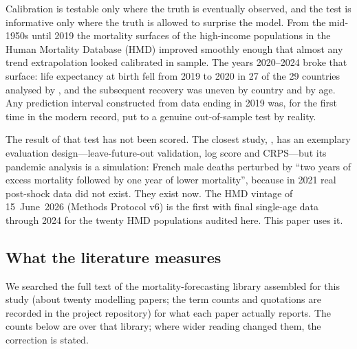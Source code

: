Calibration is testable only where the truth is eventually observed, and the
test is informative only where the truth is allowed to surprise the model.
From the mid-1950s until 2019 the mortality surfaces of the high-income
populations in the Human Mortality Database (HMD) improved smoothly enough
that almost any trend extrapolation looked calibrated in sample. The years
2020--2024 broke that surface: life expectancy at birth fell from 2019 to
2020 in 27 of the 29 countries analysed by \citet{aburto2022quantifying},
and the subsequent recovery was uneven by country and by age. Any
prediction interval constructed from data ending in 2019 was,
for the first time in the modern record, put to a genuine out-of-sample test
by reality.

The result of that test has not been scored. The closest study,
\citet{barigou2023bayesian}, has an exemplary evaluation
design---leave-future-out validation, log score and CRPS---but its pandemic
analysis is a simulation: French male deaths perturbed by ``two years of
excess mortality followed by one year of lower mortality'', because in 2021
real post-shock data did not exist. They exist now. The HMD vintage of
15~June~2026 (Methods Protocol v6) is the first with final single-age data
through 2024 for the twenty HMD populations audited here. This paper uses
it.

\subsection{What the literature measures}

We searched the full text of the mortality-forecasting library assembled for
this study (about twenty modelling papers; the term counts and quotations are
recorded in the project repository) for what each paper actually reports.
The counts below are over that library; where wider reading changed them,
the correction is stated.

